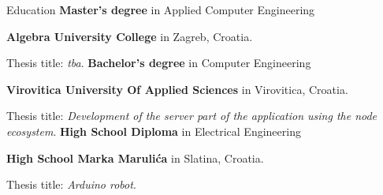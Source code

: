 \begin{rubric}{Education}
%
	\textbf{Master's degree} in Applied Computer Engineering \par \textbf{Algebra University College} in Zagreb, Croatia.
	\par Thesis title: \emph{tba}.
%
%
	\textbf{Bachelor's degree} in Computer Engineering \par \textbf{Virovitica University Of Applied Sciences} in Virovitica, Croatia.\par
	Thesis title: \emph{Development of the server part of the application using the node ecosystem}.
% 
%
	\textbf{High School Diploma} in Electrical Engineering \par \textbf{High School Marka Marulića} in Slatina, Croatia.\par
	Thesis title: \emph{Arduino robot}.
\end{rubric}